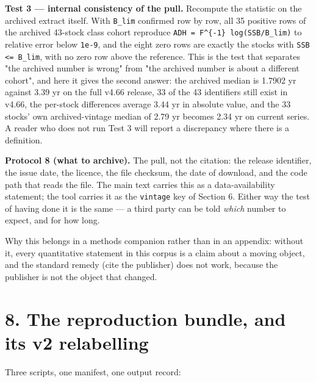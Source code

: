 \documentclass[11pt]{article}
\begin{document}
\textbf{Test 3 --- internal consistency of the pull.} Recompute the statistic on the archived extract itself. With \texttt{B\_lim} confirmed row by row, all 35 positive rows of the archived 43-stock class cohort reproduce \texttt{ADH = F\textasciicircum{}\{-1\} log(SSB/B\_lim)} to relative error below \texttt{1e-9}, and the eight zero rows are exactly the stocks with \texttt{SSB <= B\_lim}, with no zero row above the reference. This is the test that separates "the archived number is wrong" from "the archived number is about a different cohort", and here it gives the second answer: the archived median is 1.7902 yr against 3.39 yr on the full v4.66 release, 33 of the 43 identifiers still exist in v4.66, the per-stock differences average 3.44 yr in absolute value, and the 33 stocks' own archived-vintage median of 2.79 yr becomes 2.34 yr on current series. A reader who does not run Test 3 will report a discrepancy where there is a definition.

\textbf{Protocol 8 (what to archive).} The pull, not the citation: the release identifier, the issue date, the licence, the file checksum, the date of download, and the code path that reads the file. The main text carries this as a data-availability statement; the tool carries it as the \texttt{vintage} key of Section 6. Either way the test of having done it is the same --- a third party can be told \emph{which} number to expect, and for how long.

Why this belongs in a methods companion rather than in an appendix: without it, every quantitative statement in this corpus is a claim about a moving object, and the standard remedy (cite the publisher) does not work, because the publisher is not the object that changed.

\vspace{0.8em}

\section*{8. The reproduction bundle, and its v2 relabelling}\label{8-the-reproduction-bundle-and-its-v2-relabelling}

Three scripts, one manifest, one output record:
\end{document}
